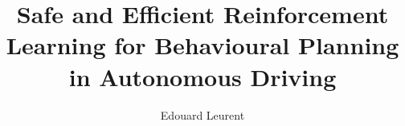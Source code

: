 \documentclass[a4paper,12pt,twoside,PageStyleII,draft,custombib]{0-Misc/PhDThesisPSnPDF}
\title{Safe and Efficient Reinforcement Learning for Behavioural Planning in Autonomous Driving}
\author{Edouard Leurent}
\begin{document}
	\frontmatter
	

	\begin{spacing}{1}
		\dominitoc
		\tableofcontents
	\end{spacing}

	\glsaddallunused
	\printglossary[type=main, title={List of Acronyms}]
	\label{chapter:nomenclature}
	\newcommand*{\Agroupname}{Mathematical notations}
	\newcommand*{\Bgroupname}{Markov Decision Processes}
	\newcommand*{\Egroupname}{Budgeted Reinforcement Learning}
	\newcommand*{\Zgroupname}{Linear Systems}
	\printglossary[type=symbols, title={List of Symbols}]

	\mainmatter

	

	

	\newpage


	{%
		\let\cleardoublepage\clearpage%
		\listoffigures
		\let\cleardoublepage\clearpage%
		\listofalgorithms
		\let\cleardoublepage\clearpage%
		\listoftables
	}

	\begin{spacing}{0.93}
%		
%		
%		
%		
		\cleardoublepage
%		

		\printbibliography[heading=bibintoc]

	\end{spacing}


	\backmatter
	\cleartoleftpage
	
\end{document}
